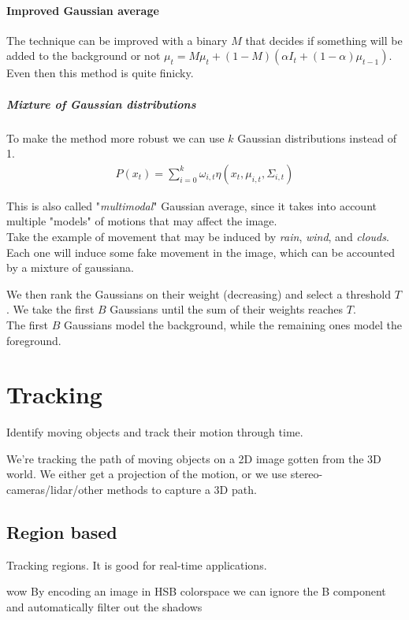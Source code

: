 \documentclass{article}
\begin{document}
\paragraph{Improved Gaussian average} The technique can be improved with a binary $M$ that decides if something will be added to the background or not $\mu_t = M\mu_t + (1-M)(\alpha I_t + (1-\alpha)\mu_{t-1})$. Even then this method is quite finicky.

\subparagraph{Mixture of Gaussian distributions}
To make the method more robust we can use $k$ Gaussian distributions instead of 1.
\begin{align*}
    P(x_t) = \sum_{i=0}^k \omega_{i,t}\eta(x_t,\mu_{i,t},\Sigma_{i,t})
\end{align*}

This is also called "\textit{multimodal}" Gaussian average, since it takes into account multiple "models" of motions that may affect the image.\\
Take the example of movement that may be induced by \textit{rain}, \textit{wind}, and \textit{clouds}. Each one will induce some fake movement in the image, which can be accounted by a mixture of gaussiana.

We then rank the Gaussians on their weight (decreasing) and select a threshold $T$. We take the first $B$ Gaussians until the sum of their weights reaches $T$.\\
The first $B$ Gaussians model the background, while the remaining ones model the foreground.

\section{Tracking}
Identify moving objects and track their motion through time.

We're tracking the path of moving objects on a 2D image gotten from the 3D world. We either get a projection of the motion, or we use stereo-cameras/lidar/other methods to capture a 3D path.

\subsection{Region based}
Tracking regions. It is good for real-time applications.

\begin{callout}{wow}
    By encoding an image in HSB colorspace we can ignore the B component and automatically filter out the shadows
\end{callout}
\end{document}
